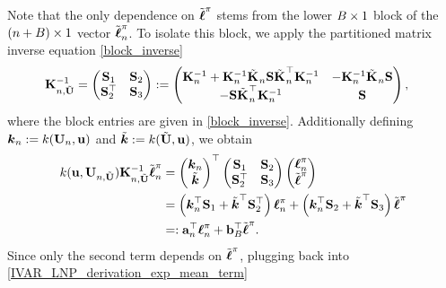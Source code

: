 \documentclass[12pt]{article}
\begin{document}
Note that the only dependence on $\logUnPostBatch$ stems from the lower $\Nbatch \times 1$ block of the $(\designIdx + \Nbatch) \times 1$ vector $\logUnPostObsBatch$. 
To isolate this block, we apply the partitioned matrix inverse equation \ref{block_inverse}
\begin{align*}
\KerMat[\designIdx, \batchMat]^{-1} &= \begin{pmatrix} \bS_{1} & \bS_{2} \\  \bS_{2}^\top & \bS_{3} \end{pmatrix} := 
\begin{pmatrix} 
	\KerMat^{-1} + \KerMat^{-1}\tilde{\KerMat[]}_{\designIdx}\mathbf{S} \tilde{\KerMat[]}_{\designIdx}^\top \KerMat^{-1} & -\KerMat^{-1}\tilde{\KerMat[]}_{\designIdx} \mathbf{S}  \\
	-\mathbf{S} \tilde{\KerMat[]}_{\designIdx}^\top \KerMat^{-1} & \mathbf{S}  
\end{pmatrix},
\end{align*}
where the block entries are given in \ref{block_inverse}. Additionally defining 
$\boldsymbol{\logUnPostKer}_{\designIdx} := \logUnPostKer(\designMat, \bpar)$ and $\tilde{\boldsymbol{\logUnPostKer}} := \logUnPostKer(\batchMat, \bpar)$, we obtain 
\begin{align*}
\logUnPostKer(\bpar, \designMat[\designIdx, \batchMat]) \KerMat[\designIdx, \batchMat]^{-1} \logUnPostObsBatch
&= \begin{pmatrix} \boldsymbol{\logUnPostKer}_{\designIdx} \\ \tilde{\boldsymbol{\logUnPostKer}}  \end{pmatrix}^\top 
\begin{pmatrix} \bS_{1} & \bS_{2} \\  \bS_{2}^\top & \bS_{3} \end{pmatrix} 
\begin{pmatrix} \logUnPostObs \\ \logUnPostBatch \end{pmatrix} \\
&= \left(\boldsymbol{\logUnPostKer}_{\designIdx}^\top \bS_1 + \tilde{\boldsymbol{\logUnPostKer}}^\top \bS_{2}^\top \right) \logUnPostObs + 
\left(\boldsymbol{\logUnPostKer}_{\designIdx}^\top \bS_2 + \tilde{\boldsymbol{\logUnPostKer}}^\top \bS_3 \right) \logUnPostBatch \\
&=: \ba_{\designIdx}^\top \logUnPostObs + \bb_{\Nbatch}^\top \logUnPostBatch.
\end{align*}
Since only the second term depends on $\logUnPostBatch$, plugging back into \ref{IVAR_LNP_derivation_exp_mean_term} 
\end{document}
